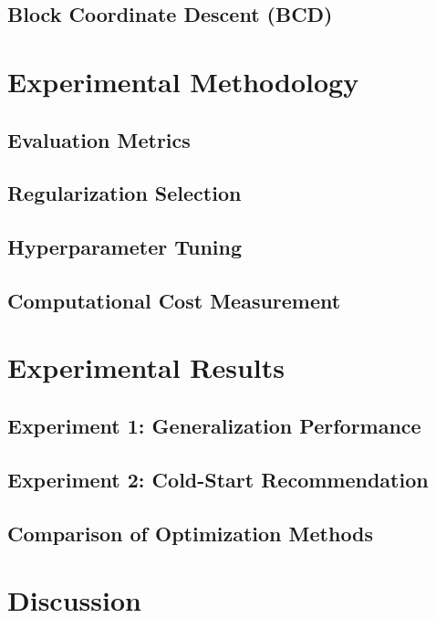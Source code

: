 \documentclass[12pt,a4paper]{article}
\begin{document}
\subsection{Block Coordinate Descent (BCD)}

\section{Experimental Methodology}
\label{sec:protocol}

\subsection{Evaluation Metrics}
\subsection{Regularization Selection}
\subsection{Hyperparameter Tuning}
\subsection{Computational Cost Measurement}

\section{Experimental Results}
\label{sec:results}

\subsection{Experiment 1: Generalization Performance}
\subsection{Experiment 2: Cold-Start Recommendation}
\subsection{Comparison of Optimization Methods}

\section{Discussion}
\label{sec:discussion}
\end{document}
